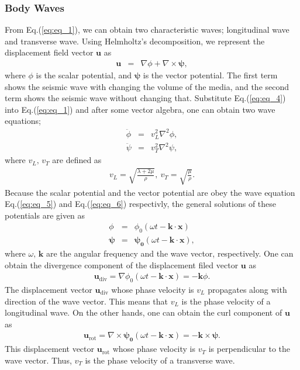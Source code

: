 \subsubsection{Body Waves}
From Eq.(\ref{eq:eq_1}), we can obtain two characteristic waves; longitudinal wave and transverse wave. Using Helmholtz's decomposition, we represent the displacement field vector $\bm{u}$ as
\begin{eqnarray} 
  \bm{u} &=& \nabla\phi + \nabla\times\bm{\psi}, \label{eq:eq_4}
\end{eqnarray}
where $\phi$ is the scalar potential, and $\bm{\psi}$ is the vector potential. The first term shows the seismic wave with changing the volume of the media, and the second term shows the seismic wave without changing that. Substitute Eq.(\ref{eq:eq_4}) into Eq.(\ref{eq:eq_1}) and after some vector algebra, one can obtain two wave equations;
\begin{eqnarray}
  \ddot{\phi} &=& v_{L}^2\nabla^2\phi \label{eq:eq_5},\\
  \ddot{\psi} &=& v_{T}^2\nabla^2\psi \label{eq:eq_6}, 
\end{eqnarray}
where $v_{L},\,v_{T}$ are defined as 
\begin{eqnarray}
  v_{L} = \sqrt{\frac{\lambda+2\mu}{\rho}},\
  v_{T} = \sqrt{\frac{\mu}{\rho}}. \label{eq:eq_7}
\end{eqnarray} 
Because the scalar potential and the vector potential are obey the wave equation Eq.(\ref{eq:eq_5}) and Eq.(\ref{eq:eq_6}) respectivly, the general solutions of these potentials are given as
\begin{eqnarray}
  \phi &=& \phi_{0}(\omega{t}-\bm{k}\cdot{\bm{x}}) \label{eq:eq_8}\\
  \bm{\psi} &=& \bm{\psi_{0}}(\omega{t}-\bm{k}\cdot{\bm{x}}) \label{eq:eq_9},
\end{eqnarray}
where $\omega,\,\bm{k}$ are the angular frequency and the wave vector, respectively. One can obtain the divergence component of the displacement filed vector $\bm{u}$ as
\begin{eqnarray}
  \bm{u}_{\mathrm{div}} = \nabla{\phi_{0}(\omega{t}-\bm{k}\cdot{\bm{x}})} =-\bm{k}{\phi}.
\end{eqnarray}
The displacement vector $\bm{u}_{\mathrm{div}}$ whose phase velocity is $v_{L}$ propagates along with direction of the wave vector. This means that $v_{L}$ is the phase velocity of a longitudinal wave. On the other hands, one can obtain the curl component of $\bm{u}$ as
\begin{eqnarray}
  \bm{u}_{\mathrm{rot}} = \nabla\times{\bm{\psi_{0}}(\omega{t}-\bm{k}\cdot{\bm{x}})} =-\bm{k}\times{\bm{\psi}}.
\end{eqnarray}
This displacement vector $\bm{u}_{\mathrm{rot}}$ whose phase velocity is $v_{T}$ is perpendicular to the wave vector. Thus, $v_{T}$ is the phase velocity of a transverse wave.

